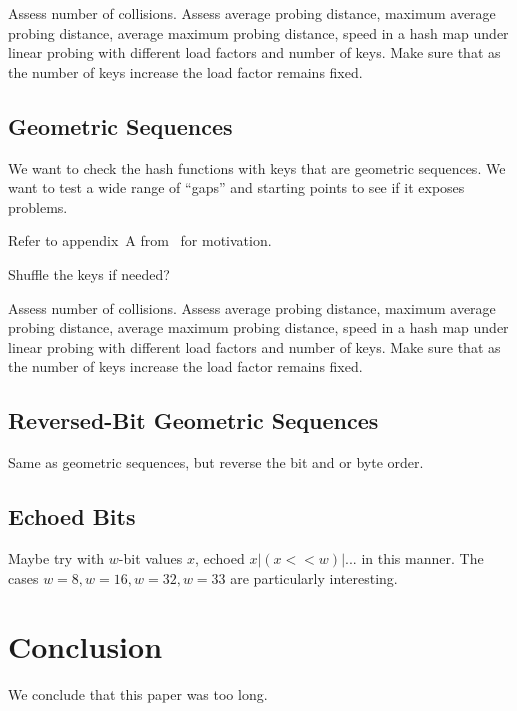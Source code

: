 \documentclass{article}
\begin{document}
Assess number of collisions.
Assess average probing distance, 
maximum average probing distance, 
average maximum probing distance, 
speed in a hash map under linear probing with different load factors and number of keys. Make sure that as the number of keys increase the load factor remains fixed.

\subsection{Geometric Sequences}

We want to check the hash functions with keys that are geometric sequences. We want to test a wide range of ``gaps'' and starting points to see if it exposes problems. 

Refer to appendix~A from~\cite{Patrascu:2012:PST:2220357.2220361} for motivation.

Shuffle the keys if needed?

Assess number of collisions.
Assess average probing distance, 
maximum average probing distance, 
average maximum probing distance, 
speed in a hash map under linear probing with different load factors and number of keys.  Make sure that as the number of keys increase the load factor remains fixed.

\subsection{Reversed-Bit Geometric Sequences}

Same as geometric sequences, but reverse the bit and or byte order.



\subsection{Echoed Bits}


Maybe try with $w$-bit values $x$, echoed $x | (x<<w) |...$ in this manner. The cases $w=8, w=16, w=32, w=33$ are particularly interesting.

\section{Conclusion}

We conclude that this paper was too long.


 
\end{document}

